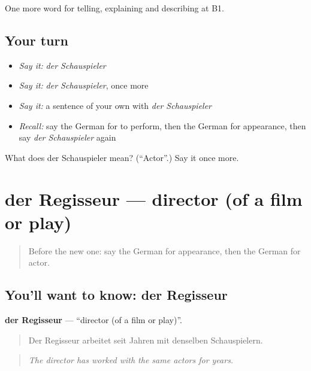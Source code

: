 \begin{grammarlens}[title={What you've built}]
One more word for telling, explaining and describing at B1.
\end{grammarlens}

\subsection*{Your turn}
\begin{itemize}
\raggedright
  \item \emph{Say it:} \emph{der Schauspieler}
  \item \emph{Say it:} \emph{der Schauspieler}, once more
  \item \emph{Say it:} a sentence of your own with \emph{der Schauspieler}
  \item \emph{Recall:} say the German for to perform, then the German for appearance, then say \emph{der Schauspieler} again
\end{itemize}

\begin{tcolorbox}[breakable,colback=teal!4,colframe=teal!35!black,title={Before you move on}]
What does der Schauspieler mean? (\textquotedblleft{}Actor\textquotedblright{}.) Say it once more.
\end{tcolorbox}
\section[der Regisseur]{der Regisseur — director (of a film or play)}

\label{lesson:GE-C517-regisseur}



\begin{quote}
Before the new one: say the German for appearance, then the German for actor.
\end{quote}

\subsection*{You'll want to know: der Regisseur}
\textbf{der Regisseur} — \textquotedblleft{}director (of a film or play)\textquotedblright{}.

\begin{quote}
Der Regisseur arbeitet seit Jahren mit denselben Schauspielern.
\end{quote}

\begin{quote}
\emph{The director has worked with the same actors for years.}
\end{quote}

